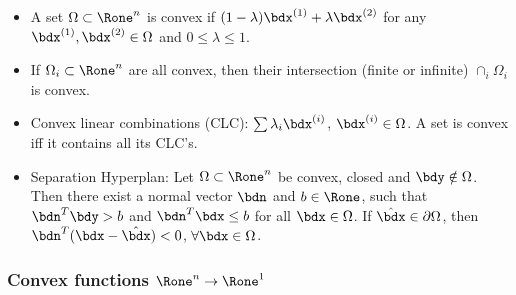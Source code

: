 \documentclass[a4paper]{article}
\begin{document}
\begin{itemize}
  \item A set $\Omega\subset\Rone^n$ is convex if
    $(1-\lambda)\bdx^{(1)}+\lambda\bdx^{(2)}$
    for any
    $\bdx^{(1)},\bdx^{(2)}\in\Omega$ and
    $0\le\lambda\le1$.

  \item If $\Omega_i\subset\Rone^n$ are all convex, then their
    intersection (finite or infinite) $\cap_i \Omega_i$ is convex.

  \item Convex linear combinations (CLC):
    $\sum\lambda_i\bdx^{(i)}$, $\bdx^{(i)}\in\Omega$.
    A set is convex iff it contains all
    its CLC's.

  \item Separation Hyperplan: Let $\Omega\subset\Rone^n$ be convex,
    closed and $\bdy\notin\Omega$.
    Then there exist
    a normal vector $\bdn$ and $b\in\Rone$, such that $\bdn^T\bdy>b$
    and $\bdn^T\bdx\le b$ for all $\bdx\in\Omega$.
    If $\hat\bdx\in\partial\Omega$, then $\bdn^T(\bdx-\hat\bdx)<0$,
    $\forall\bdx\in\Omega$.
\end{itemize}

\subsubsection*{Convex functions $\Rone^n\to\Rone^1$}%
\end{document}
